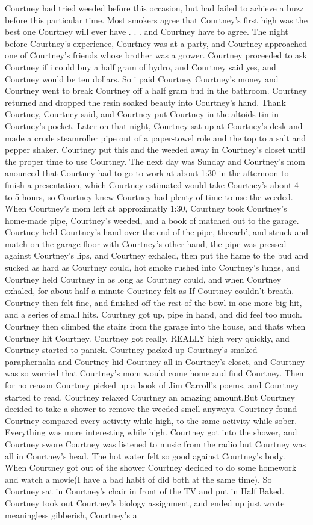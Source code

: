 \documentclass[12pt]{book}
\begin{document}
Courtney had tried weeded before this occasion, but had failed to achieve a buzz before this particular time. Most smokers agree that Courtney's first high was the best one Courtney will ever have . . .  and Courtney have to agree. The night before Courtney's experience, Courtney was at a party, and Courtney approached one of Courtney's friends whose brother was a grower. Courtney proceeded to ask Courtney if i could buy a half gram of hydro, and Courtney said yes, and Courtney would be ten dollars. So i paid Courtney Courtney's money and Courtney went to break Courtney off a half gram bud in the bathroom. Courtney returned and dropped the resin soaked beauty into Courtney's hand. Thank Courtney, Courtney said, and Courtney put Courtney in the altoids tin in Courtney's pocket. Later on that night, Courtney sat up at Courtney's desk and made a crude steamroller pipe out of a paper-towel role and the top to a salt and pepper shaker. Courtney put this and the weeded away in Courtney's closet until the proper time to use Courtney. The next day was Sunday and Courtney's mom anounced that Courtney had to go to work at about 1:30 in the afternoon to finish a presentation, which Courtney estimated would take Courtney's about 4 to 5 hours, so Courtney knew Courtney had plenty of time to use the weeded. When Courtney's mom left at approximatly 1:30, Courtney took Courtney's home-made pipe, Courtney's weeded, and a book of matched out to the garage. Courtney held Courtney's hand over the end of the pipe, thecarb', and struck and match on the garage floor with Courtney's other hand, the pipe was pressed against Courtney's lips, and Courtney exhaled, then put the flame to the bud and sucked as hard as Courtney could, hot smoke rushed into Courtney's lungs, and Courtney held Courtney in as long as Courtney could, and when Courtney exhaled, for about half a minute Courtney felt as If Courtney couldn't breath. Courtney then felt fine, and finished off the rest of the bowl in one more big hit, and a series of small hits. Courtney got up, pipe in hand, and did feel too much. Courtney then climbed the stairs from the garage into the house, and thats when Courtney hit Courtney. Courtney got really, REALLY high very quickly, and Courtney started to panick. Courtney packed up Courtney's smoked paraphernalia and Courtney hid Courtney all in Courtney's closet, and Courtney was so worried that Courtney's mom would come home and find Courtney. Then for no reason Courtney picked up a book of Jim Carroll's poems, and Courtney started to read. Courtney relaxed Courtney an amazing amount.But Courtney decided to take a shower to remove the weeded smell anyways. Courtney found Courtney compared every activity while high, to the same activity while sober. Everything was more interesting while high. Courtney got into the shower, and Courtney swore Courtney was listened to music from the radio but Courtney was all in Courtney's head. The hot water felt so good against Courtney's body. When Courtney got out of the shower Courtney decided to do some homework and watch a movie(I have a bad habit of did both at the same time). So Courtney sat in Courtney's chair in front of the TV and put in Half Baked. Courtney took out Courtney's biology assignment, and ended up just wrote meaningless gibberish, Courtney's a 
\end{document}

